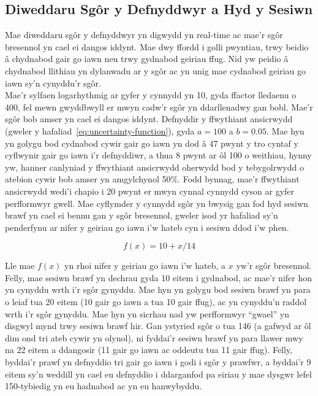 \subsection{Diweddaru Sgôr y Defnyddwyr a Hyd y Sesiwn}
Mae diweddaru sgôr y defnyddwyr yn digwydd yn real-time ac mae'r sgôr bresennol yn cael ei dangos iddynt. Mae dwy ffordd i golli pwyntiau, trwy beidio â chydnabod gair go iawn neu trwy gydnabod geiriau ffug. Nid yw peidio â chydnabod llithiau yn dylanwadu ar y sgôr ac yn unig mae cydnabod geiriau go iawn sy'n cynyddu'r sgôr.\\
Mae'r sylfaen logarhythmig ar gyfer y cynnydd yn 10, gyda ffactor lledaenu o 400, fel mewn gwyddbwyll er mwyn cadw'r sgôr yn ddarllenadwy gan bobl. Mae'r sgôr bob amser yn cael ei dangos iddynt. Defnyddir y ffwythiant ansicrwydd (gweler y hafaliad~\ref{eq:uncertainty-function}), gyda $a=100$ a $b=0.05$. Mae hyn yn golygu bod cydnabod cywir gair go iawn yn dod â 47 pwynt y tro cyntaf y cyflwynir gair go iawn i'r defnyddiwr, a thua 8 pwynt ar ôl 100 o weithiau, hynny yw, hanner canlyniad y ffwythiant ansicrwydd oherwydd bod y tebygolrwydd o atebion cywir bob amser yn amgylchynol 50\%. Fodd bynnag, mae'r ffwythiant ansicrwydd wedi'i chapio i 20 pwynt er mwyn cynnal cynnydd cyson ar gyfer perfformwyr gwell. Mae cyflymder y cynnydd sgôr yn bwysig gan fod hyd sesiwn brawf yn cael ei bennu gan y sgôr bresennol, gweler isod yr hafaliad sy'n penderfynu ar nifer y geiriau go iawn i'w hateb cyn i sesiwn ddod i'w phen.

\begin{equation}
    f(x)=10 + x/14
\end{equation}\label{eq:length-function}

Lle mae $f(x)$ yn rhoi nifer y geiriau go iawn i'w hateb, a $x$ yw'r sgôr bresennol. Felly, mae sesiwn brawf yn dechrau gyda 10 eitem i gydnabod, ac mae'r nifer hon yn cynyddu wrth i'r sgôr gynyddu. Mae hyn yn golygu bod sesiwn brawf yn para o leiaf tua 20 eitem (10 gair go iawn a tua 10 gair ffug), ac yn cynyddu'n raddol wrth i'r sgôr gynyddu. Mae hyn yn sicrhau nad yw perfformwyr ``gwael'' yn disgwyl mynd trwy sesiwn brawf hir. Gan ystyried sgôr o tua 146 (a gafwyd ar ôl dim ond tri ateb cywir yn olynol), ni fyddai'r sesiwn brawf yn para llawer mwy na 22 eitem a ddangosir (11 gair go iawn ac oddeutu tua 11 gair ffug). Felly, byddai'r prawf yn defnyddio tri gair go iawn i godi i sgôr y prawfwr, a byddai'r 9 eitem sy'n weddill yn cael eu defnyddio i ddarganfod pa eiriau y mae dysgwr lefel 150-tybiedig yn eu hadnabod ac yn eu hanwybyddu.

